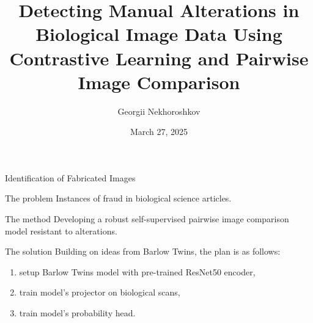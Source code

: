 \documentclass[]{beamer}
\title{ Detecting Manual Alterations in Biological Image Data
Using Contrastive Learning and Pairwise Image Comparison}
\author{Georgii Nekhoroshkov}
\institute[]{Moscow Institute of Physics and Technology}
\date{March 27, 2025}
\begin{document}
\begin{frame}
\titlepage
\end{frame}
\begin{frame}{Identification of Fabricated Images}
\begin{block}{The problem}
Instances of fraud in biological science articles.
\end{block}
\begin{block}{The method}
Developing a robust self-supervised pairwise image comparison model resistant to alterations.
\end{block}
\begin{block}{The solution}
Building on ideas from Barlow Twins, the plan is as follows:
\begin{enumerate}[1)]
\item setup Barlow Twins model with pre-trained ResNet50 encoder,
\item train model's projector on biological scans,
\item train model's probability head.
\end{enumerate}
\end{block}
\end{frame}
\end{document}
